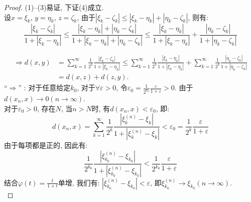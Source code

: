 \documentclass[lang=cn,10pt]{gorgeousnbook}
\numberwithin{equation}{section}%
\numberwithin{figure}{section}%
\begin{document}
\begin{proof}
 (1)--(3)易证, 下证(4)成立. \\
设$x={\xi_k}$, $y={\eta_k}$, $z={\zeta_k}$, 由于$\left| \xi _k-\zeta _k \right|\le \left| \xi _k-\eta _k \right|+\left| \eta _k-\zeta _k \right|$, 则有:\\
\begin{equation}
  \frac{\left| \xi _k-\zeta _k \right|}{1+\left| \xi _k-\eta _k \right|}\le \frac{\left| \xi _k-\eta _k \right|+\left| \eta _k-\zeta _k \right|}{1+\left| \xi _k-\eta _k \right|+\left| \eta _k-\zeta _k \right|}\le \frac{\left| \xi _k-\eta _k \right|}{1+\left| \xi _k-\eta _k \right|}+\frac{\left| \eta _k-\zeta _k \right|}{1+\left| \eta _k-\zeta _k \right|}
  \nonumber
\end{equation}
  
	\begin{equation}
	 \begin{aligned}
	    \Rightarrow d\left( x,y \right) &=\sum_{k=1}^{\infty}{\frac{1}{2^k}\frac{\left| \xi _k-\zeta _k \right|}{1+\left| \xi _k-\eta _k \right|}}\le \sum_{k=1}^{\infty}{\frac{1}{2^k}\frac{\left| \xi _k-\eta _k \right|}{1+\left| \xi _k-\eta _k \right|}}+\sum_{k=1}^{\infty}{\frac{1}{2^k}\frac{\left| \eta _k-\zeta _k \right|}{1+\left| \eta _k-\zeta _k \right|}}\\\nonumber
	    &=d\left( x,z \right) +d\left( z,y \right).\nonumber   
	 \end{aligned}
	\end{equation}
“$\Longrightarrow $” : 对于任意给定$k_0$, 对于$\forall \varepsilon > 0$, 令$\varepsilon _0=\frac{1}{2^{k_0}}\frac{\varepsilon}{1+\varepsilon}>0$. 由于$d(x_n,x)\rightarrow 0(n\rightarrow \infty)$.\\
对于$\varepsilon_0 >0$, 存在$N$, 当$n>N$时, 有$d(x_n,x)<\varepsilon_0$, 即:
\begin{equation}
d(x_n,x)=\sum_{k=1}^{\infty}{\frac{1}{2^k}\frac{\left| \xi _{k}^{\left( n \right)}-\xi _k \right|}{1+\left| \xi _{k}^{\left( n \right)}-\xi _k \right|}}<\varepsilon _0=\frac{1}{2^k}\frac{\varepsilon}{1+\varepsilon}\nonumber 
\end{equation}
由于每项都是正的, 因此有: 
\begin{equation}
  \frac{1}{2^{k_0}}\frac{\left| \xi _{k_0}^{\left( n \right)}-\xi _{k_0} \right|}{1+\left| \xi _{k_0}^{\left( n \right)}-\xi _{k_0} \right|}<\frac{1}{2^{k_0}}\frac{\varepsilon}{1+\varepsilon}
  \nonumber 
\end{equation}
结合$\varphi \left( t \right) =\frac{t}{1+t}$单增, 我们有: $\left| \xi _{k_0}^{\left( n \right)}-\xi _{k_0} \right|<\varepsilon$, 即$\xi _{k_0}^{\left( n \right)}\rightarrow \xi _{k_0}\left( n\rightarrow \infty \right)$. \\

\end{proof}
\end{document}
